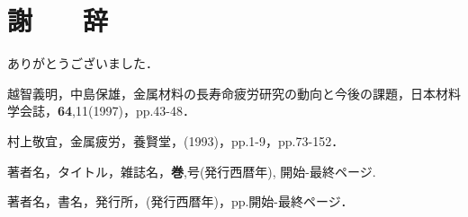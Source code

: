 \documentclass{jsarticle}
\begin{document}
\section*{謝　　辞}
ありがとうございました．

\begin{thebibliography}{99}
越智義明，中島保雄，金属材料の長寿命疲労研究の動向と今後の課題，日本材料学会誌，{\bfseries 64},11(1997)，pp.43-48．

村上敬宜，金属疲労，養賢堂，(1993)，pp.1-9，pp.73-152．

著者名，タイトル，雑誌名，{\bfseries 巻},号(発行西暦年), 開始-最終ページ.

著者名，書名，発行所，(発行西暦年)，pp.開始-最終ページ．
\end{thebibliography}
\end{document}
